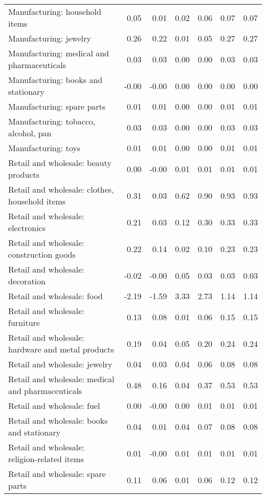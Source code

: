 \begin{longtable}{lrrrrrr}
  Manufacturing: household items & 0.05 & 0.01 & 0.02 & 0.06 & 0.07 & 0.07 \\ 
  Manufacturing: jewelry & 0.26 & 0.22 & 0.01 & 0.05 & 0.27 & 0.27 \\ 
  Manufacturing: medical and pharmaceuticals & 0.03 & 0.03 & 0.00 & 0.00 & 0.03 & 0.03 \\ 
  Manufacturing: books and stationary & -0.00 & -0.00 & 0.00 & 0.00 & 0.00 & 0.00 \\ 
  Manufacturing: spare parts & 0.01 & 0.01 & 0.00 & 0.00 & 0.01 & 0.01 \\ 
  Manufacturing: tobacco, alcohol, pan & 0.03 & 0.03 & 0.00 & 0.00 & 0.03 & 0.03 \\ 
  Manufacturing: toys & 0.01 & 0.01 & 0.00 & 0.00 & 0.01 & 0.01 \\ 
  Retail and wholesale: beauty products & 0.00 & -0.00 & 0.01 & 0.01 & 0.01 & 0.01 \\ 
  Retail and wholesale: clothes, household items & 0.31 & 0.03 & 0.62 & 0.90 & 0.93 & 0.93 \\ 
  Retail and wholesale: electronics & 0.21 & 0.03 & 0.12 & 0.30 & 0.33 & 0.33 \\ 
  Retail and wholesale: construction goods & 0.22 & 0.14 & 0.02 & 0.10 & 0.23 & 0.23 \\ 
  Retail and wholesale: decoration & -0.02 & -0.00 & 0.05 & 0.03 & 0.03 & 0.03 \\ 
  Retail and wholesale: food & -2.19 & -1.59 & 3.33 & 2.73 & 1.14 & 1.14 \\ 
  Retail and wholesale: furniture & 0.13 & 0.08 & 0.01 & 0.06 & 0.15 & 0.15 \\ 
  Retail and wholesale: hardware and metal products & 0.19 & 0.04 & 0.05 & 0.20 & 0.24 & 0.24 \\ 
  Retail and wholesale: jewelry & 0.04 & 0.03 & 0.04 & 0.06 & 0.08 & 0.08 \\ 
  Retail and wholesale: medical and pharmaceuticals & 0.48 & 0.16 & 0.04 & 0.37 & 0.53 & 0.53 \\ 
  Retail and wholesale: fuel & 0.00 & -0.00 & 0.00 & 0.01 & 0.01 & 0.01 \\ 
  Retail and wholesale: books and stationary & 0.04 & 0.01 & 0.04 & 0.07 & 0.08 & 0.08 \\ 
  Retail and wholesale: religion-related items & 0.01 & -0.00 & 0.01 & 0.01 & 0.01 & 0.01 \\ 
  Retail and wholesale: spare parts & 0.11 & 0.06 & 0.01 & 0.06 & 0.12 & 0.12 \\ 

\end{longtable}
